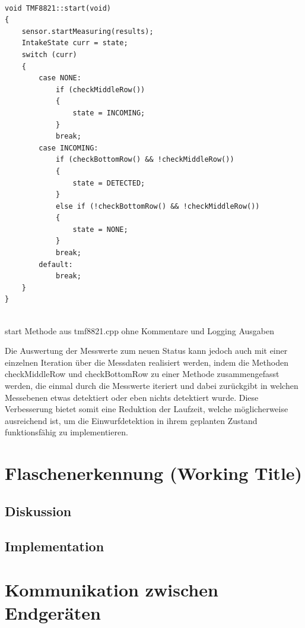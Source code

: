         \begin{listing}
            \begin{verbatim}
            
void TMF8821::start(void)
{
    sensor.startMeasuring(results);
    IntakeState curr = state;
    switch (curr) 
    {
        case NONE:
            if (checkMiddleRow())
            {
                state = INCOMING;
            }
            break;
        case INCOMING:
            if (checkBottomRow() && !checkMiddleRow())
            {
                state = DETECTED;
            }
            else if (!checkBottomRow() && !checkMiddleRow())
            {
                state = NONE;
            }
            break;
        default:
            break;
    }
}
            
            \end{verbatim}            
            \caption{start Methode aus tmf8821.cpp ohne Kommentare und Logging Ausgaben}            
            \label{lst:tmf8821_start}            
        \end{listing}

        Die Auswertung der Messwerte zum neuen Status kann jedoch auch mit einer einzelnen Iteration über die Messdaten realisiert werden, indem die Methoden checkMiddleRow und checkBottomRow zu einer Methode zusammengefasst werden, die einmal durch die Messwerte iteriert und dabei zurückgibt in welchen Messebenen etwas detektiert oder eben nichts detektiert wurde. Diese Verbesserung bietet somit eine Reduktion der Laufzeit, welche möglicherweise ausreichend ist, um die Einwurfdetektion in ihrem geplanten Zustand funktionsfähig zu implementieren.
        
\section{Flaschenerkennung (Working Title)}
    \subsection{Diskussion}

    \subsection{Implementation}

\section{Kommunikation zwischen Endgeräten}
